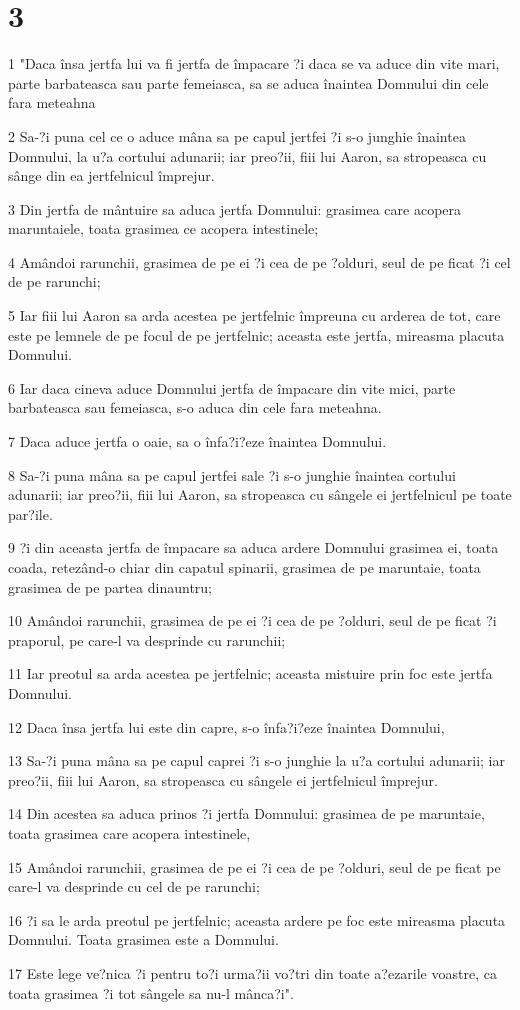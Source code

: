 \chapter{3}

\par 1 "Daca însa jertfa lui va fi jertfa de împacare ?i daca se va aduce din vite mari, parte barbateasca sau parte femeiasca, sa se aduca înaintea Domnului din cele fara meteahna
\par 2 Sa-?i puna cel ce o aduce mâna sa pe capul jertfei ?i s-o junghie înaintea Domnului, la u?a cortului adunarii; iar preo?ii, fiii lui Aaron, sa stropeasca cu sânge din ea jertfelnicul împrejur.
\par 3 Din jertfa de mântuire sa aduca jertfa Domnului: grasimea care acopera maruntaiele, toata grasimea ce acopera intestinele;
\par 4 Amândoi rarunchii, grasimea de pe ei ?i cea de pe ?olduri, seul de pe ficat ?i cel de pe rarunchi;
\par 5 Iar fiii lui Aaron sa arda acestea pe jertfelnic împreuna cu arderea de tot, care este pe lemnele de pe focul de pe jertfelnic; aceasta este jertfa, mireasma placuta Domnului.
\par 6 Iar daca cineva aduce Domnului jertfa de împacare din vite mici, parte barbateasca sau femeiasca, s-o aduca din cele fara meteahna.
\par 7 Daca aduce jertfa o oaie, sa o înfa?i?eze înaintea Domnului.
\par 8 Sa-?i puna mâna sa pe capul jertfei sale ?i s-o junghie înaintea cortului adunarii; iar preo?ii, fiii lui Aaron, sa stropeasca cu sângele ei jertfelnicul pe toate par?ile.
\par 9 ?i din aceasta jertfa de împacare sa aduca ardere Domnului grasimea ei, toata coada, retezând-o chiar din capatul spinarii, grasimea de pe maruntaie, toata grasimea de pe partea dinauntru;
\par 10 Amândoi rarunchii, grasimea de pe ei ?i cea de pe ?olduri, seul de pe ficat ?i praporul, pe care-l va desprinde cu rarunchii;
\par 11 Iar preotul sa arda acestea pe jertfelnic; aceasta mistuire prin foc este jertfa Domnului.
\par 12 Daca însa jertfa lui este din capre, s-o înfa?i?eze înaintea Domnului,
\par 13 Sa-?i puna mâna sa pe capul caprei ?i s-o junghie la u?a cortului adunarii; iar preo?ii, fiii lui Aaron, sa stropeasca cu sângele ei jertfelnicul împrejur.
\par 14 Din acestea sa aduca prinos ?i jertfa Domnului: grasimea de pe maruntaie, toata grasimea care acopera intestinele,
\par 15 Amândoi rarunchii, grasimea de pe ei ?i cea de pe ?olduri, seul de pe ficat pe care-l va desprinde cu cel de pe rarunchi;
\par 16 ?i sa le arda preotul pe jertfelnic; aceasta ardere pe foc este mireasma placuta Domnului. Toata grasimea este a Domnului.
\par 17 Este lege ve?nica ?i pentru to?i urma?ii vo?tri din toate a?ezarile voastre, ca toata grasimea ?i tot sângele sa nu-l mânca?i".

